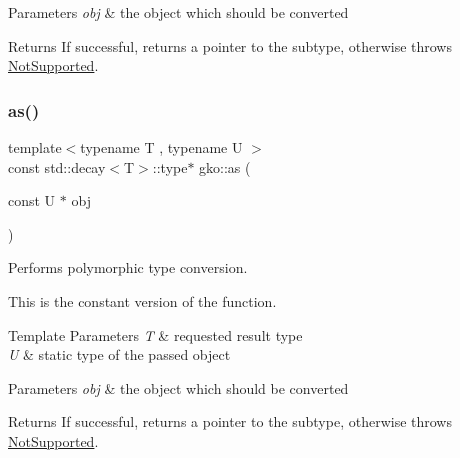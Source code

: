 \begin{DoxyParams}{Parameters}
{\em obj} & the object which should be converted\\
\hline
\end{DoxyParams}
\begin{DoxyReturn}{Returns}
If successful, returns a pointer to the subtype, otherwise throws \hyperlink{classgko_1_1NotSupported}{Not\+Supported}. 
\end{DoxyReturn}
\mbox{\label{namespacegko_a289e84ef5dea2f579dd12f27140a1470}} 
\subsubsection{\texorpdfstring{as()}{as()}\hspace{0.1cm}{\footnotesize\ttfamily [2/2]}}
{\footnotesize\ttfamily template$<$typename T , typename U $>$ \\
const std\+::decay$<$T$>$\+::type$\ast$ gko\+::as (\begin{DoxyParamCaption}\item[{const U $\ast$}]{obj }\end{DoxyParamCaption})\hspace{0.3cm}{\ttfamily [inline]}}



Performs polymorphic type conversion. 

This is the constant version of the function.


\begin{DoxyTemplParams}{Template Parameters}
{\em T} & requested result type \\
\hline
{\em U} & static type of the passed object\\
\hline
\end{DoxyTemplParams}

\begin{DoxyParams}{Parameters}
{\em obj} & the object which should be converted\\
\hline
\end{DoxyParams}
\begin{DoxyReturn}{Returns}
If successful, returns a pointer to the subtype, otherwise throws \hyperlink{classgko_1_1NotSupported}{Not\+Supported}. 
\end{DoxyReturn}
\mbox{\label{namespacegko_a93065a86872e6511b701b73b75823483}} 
